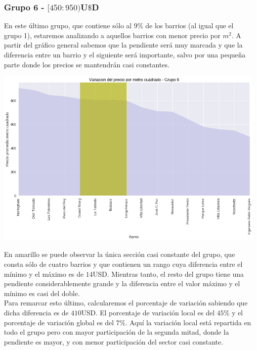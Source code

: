 \documentclass[a4paper, 10pt]{article}
\newcommand\tab[1][0.5cm]{\hspace*{#1}}
\begin{document}
				\subsubsection{Grupo 6 - $[450:950)$U$\$$D}
					En este último grupo, que contiene sólo al $9\%$ de los barrios (al igual que el grupo 1), estaremos analizando
					a aquellos barrios con menor precio por $m^2$. A partir del gráfico general sabemos que la pendiente será muy
					marcada y que la diferencia entre un barrio y el siguiente será importante, salvo por una pequeña parte donde
					los precios se mantendrán casi constantes.
					\begin{center}
   		    				\includegraphics[width=\textwidth]{images/m2Group6Area}
				  	\end{center}
					\tab En amarillo se puede observar la única sección casi constante del grupo, que consta sólo de cuatro barrios
					y que contienen un rango cuya diferencia entre el mínimo y el máximo es de $14$USD. Mientras tanto, el resto
					del grupo tiene una pendiente considerablemente grande y la diferencia entre el valor máximo y el mínimo es casi
					del doble. \\
					\tab Para remarcar esto último, calcularemos el porcentaje de variación sabiendo que dicha diferencia es de
					$410$USD. El porcentaje de variación local es del $45\%$ y el porcentaje de variación global es del $7\%$. Aquí
					la variación local está repartida en todo el grupo pero con mayor participación de la segunda mitad, donde la
					pendiente es mayor, y con menor participación del sector casi constante.\\
\end{document}
